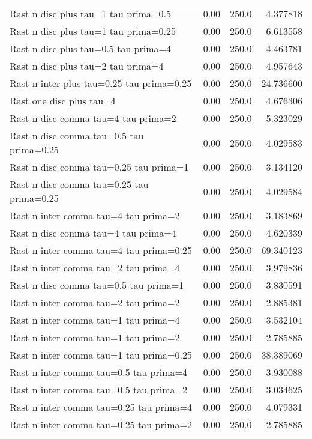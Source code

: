 \documentclass[11pt]{article}
\begin{document}
\begin{tabular}{lrrr}
Rast n disc  plus  tau=1 tau prima=0.5     &  0.00 &  250.0 &   4.377818 \\
Rast n disc  plus  tau=1 tau prima=0.25    &  0.00 &  250.0 &   6.613558 \\
Rast n disc  plus  tau=0.5 tau prima=4     &  0.00 &  250.0 &   4.463781 \\
Rast n disc  plus  tau=2 tau prima=4       &  0.00 &  250.0 &   4.957643 \\
Rast n inter plus  tau=0.25 tau prima=0.25 &  0.00 &  250.0 &  24.736600 \\
Rast one disc  plus  tau=4                 &  0.00 &  250.0 &   4.676306 \\
Rast n disc  comma tau=4 tau prima=2       &  0.00 &  250.0 &   5.323029 \\
Rast n disc  comma tau=0.5 tau prima=0.25  &  0.00 &  250.0 &   4.029583 \\
Rast n disc  comma tau=0.25 tau prima=1    &  0.00 &  250.0 &   3.134120 \\
Rast n disc  comma tau=0.25 tau prima=0.25 &  0.00 &  250.0 &   4.029584 \\
Rast n inter comma tau=4 tau prima=2       &  0.00 &  250.0 &   3.183869 \\
Rast n disc  comma tau=4 tau prima=4       &  0.00 &  250.0 &   4.620339 \\
Rast n inter comma tau=4 tau prima=0.25    &  0.00 &  250.0 &  69.340123 \\
Rast n inter comma tau=2 tau prima=4       &  0.00 &  250.0 &   3.979836 \\
Rast n disc  comma tau=0.5 tau prima=1     &  0.00 &  250.0 &   3.830591 \\
Rast n inter comma tau=2 tau prima=2       &  0.00 &  250.0 &   2.885381 \\
Rast n inter comma tau=1 tau prima=4       &  0.00 &  250.0 &   3.532104 \\
Rast n inter comma tau=1 tau prima=2       &  0.00 &  250.0 &   2.785885 \\
Rast n inter comma tau=1 tau prima=0.25    &  0.00 &  250.0 &  38.389069 \\
Rast n inter comma tau=0.5 tau prima=4     &  0.00 &  250.0 &   3.930088 \\
Rast n inter comma tau=0.5 tau prima=2     &  0.00 &  250.0 &   3.034625 \\
Rast n inter comma tau=0.25 tau prima=4    &  0.00 &  250.0 &   4.079331 \\
Rast n inter comma tau=0.25 tau prima=2    &  0.00 &  250.0 &   2.785885 \\

\end{tabular}
\end{document}
